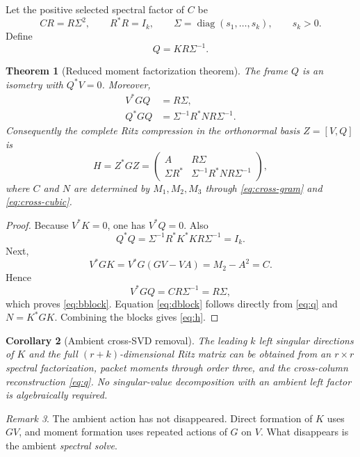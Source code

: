 \documentclass[11pt]{article}
\newtheorem{theorem}{Theorem}[section]
\newtheorem{corollary}[theorem]{Corollary}
\theoremstyle{definition}
\theoremstyle{remark}
\newtheorem{remark}[theorem]{Remark}
\begin{document}
Let the positive selected spectral factor of $C$ be
\begin{equation}
 CR=R\Sigma^2,\qquad R^*R=I_k,\qquad
 \Sigma=\operatorname{diag}(s_1,\ldots,s_k),\qquad s_k>0.
 \label{eq:selected}
\end{equation}
Define
\begin{equation}
 Q=KR\Sigma^{-1}.
 \label{eq:q}
\end{equation}

\begin{theorem}[Reduced moment factorization theorem]
\label{thm:factorization}
The frame $Q$ is an isometry with $Q^*V=0$.  Moreover,
\begin{align}
 V^*GQ&=R\Sigma, \label{eq:bblock}\\
 Q^*GQ&=\Sigma^{-1}R^*NR\Sigma^{-1}. \label{eq:dblock}
\end{align}
Consequently the complete Ritz compression in the orthonormal basis
$Z=[V,Q]$ is
\begin{equation}
 H=Z^*GZ=
 \begin{pmatrix}
 A&R\Sigma\\
 \Sigma R^*&\Sigma^{-1}R^*NR\Sigma^{-1}
 \end{pmatrix},
 \label{eq:h}
\end{equation}
where $C$ and $N$ are determined by $M_1,M_2,M_3$ through
\eqref{eq:cross-gram} and \eqref{eq:cross-cubic}.
\end{theorem}

\begin{proof}
Because $V^*K=0$, one has $V^*Q=0$.  Also
\[
 Q^*Q
 =\Sigma^{-1}R^*K^*KR\Sigma^{-1}
 =I_k.
\]
Next,
\[
 V^*GK=V^*G(GV-VA)=M_2-A^2=C.
\]
Hence
\[
 V^*GQ=CR\Sigma^{-1}=R\Sigma,
\]
which proves \eqref{eq:bblock}.  Equation \eqref{eq:dblock} follows directly
from \eqref{eq:q} and $N=K^*GK$.  Combining the blocks gives
\eqref{eq:h}.
\end{proof}

\begin{corollary}[Ambient cross-SVD removal]
The leading $k$ left singular directions of $K$ and the full
$(r+k)$-dimensional Ritz matrix can be obtained from an $r\times r$ spectral
factorization, packet moments through order three, and the cross-column
reconstruction \eqref{eq:q}.  No singular-value decomposition with an
ambient left factor is algebraically required.
\end{corollary}

\begin{remark}
The ambient action has not disappeared.  Direct formation of $K$ uses $GV$,
and moment formation uses repeated actions of $G$ on $V$.  What disappears is
the ambient \emph{spectral solve}.
\end{remark}
\end{document}
